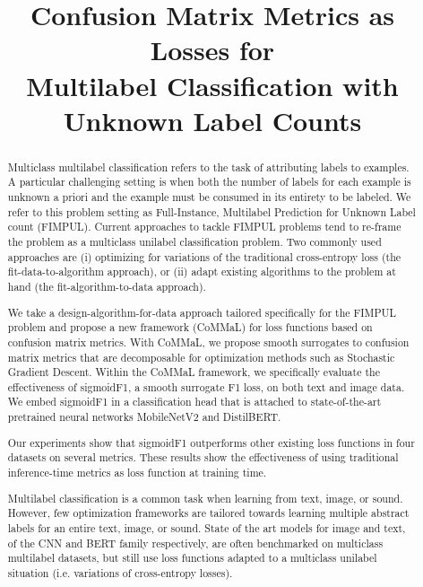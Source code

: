 \documentclass[sigconf,natbib,screen=true,review=true,anonymous]{acmart}
\begin{document}
\title[Confusion Matrix Metrics as Losses for Multilabel Classification]{Confusion Matrix Metrics as Losses for \\ Multilabel Classification with Unknown Label Counts}


\begin{abstract}

Multiclass multilabel classification refers to the task of attributing labels to examples. A particular challenging setting is when both the number of labels for each example is unknown a priori and the example must be consumed in its entirety to be labeled. We refer to this problem setting as Full-Instance, Multilabel Prediction for Unknown Label count (FIMPUL). Current approaches to tackle FIMPUL problems tend to re-frame the problem as a multiclass unilabel classification problem. Two commonly used approaches are (i) optimizing for variations of the traditional cross-entropy loss (the fit-data-to-algorithm approach), or (ii) adapt existing algorithms to the problem at hand (the fit-algorithm-to-data approach).

We take a design-algorithm-for-data approach tailored specifically for the FIMPUL problem and propose a new framework (CoMMaL) for loss functions based on confusion matrix metrics. With CoMMaL, we propose smooth surrogates to confusion matrix metrics that are decomposable for optimization methods such as Stochastic Gradient Descent. Within the CoMMaL framework, we specifically evaluate the effectiveness of sigmoidF1, a smooth surrogate F1 loss, on both text and image data. We embed sigmoidF1 in a classification head that is attached to state-of-the-art pretrained neural networks MobileNetV2 and DistilBERT.

Our experiments show that sigmoidF1 outperforms other existing loss functions in four datasets on several metrics. These results show the effectiveness of using traditional inference-time metrics as loss function at training time.

Multilabel classification is a common task when learning from text, image, or sound. However, few optimization frameworks are tailored towards learning multiple abstract labels for an entire text, image, or sound. State of the art models for image and text, of the CNN and BERT family respectively, are often benchmarked on multiclass multilabel datasets, but still use loss functions adapted to a multiclass unilabel situation (i.e. variations of cross-entropy losses).


\end{abstract}
\end{document}
